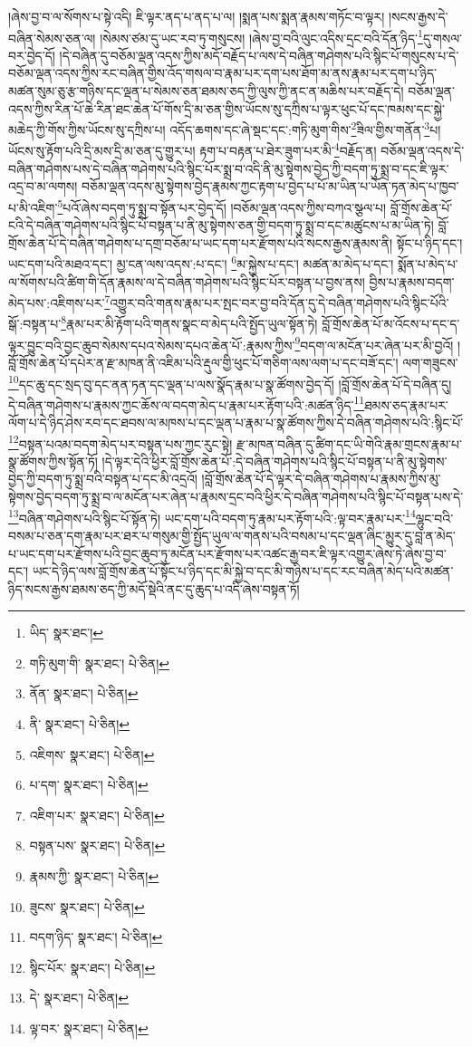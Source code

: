 །ཞེས་བྱ་བ་ལ་སོགས་པ་སྟེ་འདི། ཇི་ལྟར་ནད་པ་ནད་པ་ལ། །སྨན་པས་སྨན་རྣམས་གཏོང་བ་ལྟར། །སངས་རྒྱས་དེ་བཞིན་སེམས་ཅན་ལ། །སེམས་ཙམ་དུ་ཡང་རབ་ཏུ་གསུངས། །ཞེས་བྱ་བའི་ལུང་འདིས་དྲང་བའི་དོན་ཉིད་\footnote{ཡིད་  སྣར་ཐང་། }དུ་གསལ་བར་བྱེད་དོ། །དེ་བཞིན་དུ་བཅོམ་ལྡན་འདས་ཀྱིས་མདོ་བརྗོད་པ་ལས་དེ་བཞིན་གཤེགས་པའི་སྙིང་པོ་གསུངས་པ་དེ་བཅོམ་ལྡན་འདས་ཀྱིས་རང་བཞིན་གྱིས་འོད་གསལ་བ་རྣམ་པར་དག་པས་ཐོག་མ་ནས་རྣམ་པར་དག་པ་ཉིད་མཚན་སུམ་ཅུ་རྩ་གཉིས་དང་ལྡན་པ་སེམས་ཅན་ཐམས་ཅད་ཀྱི་ལུས་ཀྱི་ནང་ན་མཆིས་པར་བརྗོད་དེ། བཅོམ་ལྡན་འདས་ཀྱིས་རིན་པོ་ཆེ་རིན་ཐང་ཆེན་པོ་གོས་དྲི་མ་ཅན་གྱིས་ཡོངས་སུ་དཀྲིས་པ་ལྟར་ཕུང་པོ་དང་ཁམས་དང་སྐྱེ་མཆེད་ཀྱི་གོས་ཀྱིས་ཡོངས་སུ་དཀྲིས་པ། འདོད་ཆགས་དང་ཞེ་སྡང་དང་:གཏི་མུག་གིས་\footnote{གཏི་མུག་གི་  སྣར་ཐང་།  པེ་ཅིན། }ཟིལ་གྱིས་གནོན་\footnote{ནོན་  སྣར་ཐང་།  པེ་ཅིན། }པ། ཡོངས་སུ་རྟོག་པའི་དྲི་མས་དྲི་མ་ཅན་དུ་གྱུར་པ། རྟག་པ་བརྟན་པ་ཐེར་ཟུག་པར་མི་\footnote{ནི་  སྣར་ཐང་།  པེ་ཅིན། }བརྗོད་ན། བཅོམ་ལྡན་འདས་དེ་བཞིན་གཤེགས་པས་དེ་བཞིན་གཤེགས་པའི་སྙིང་པོར་སྨྲ་བ་འདི་ནི་མུ་སྟེགས་བྱེད་ཀྱི་བདག་ཏུ་སྨྲ་བ་དང་ཇི་ལྟར་འདྲ་བ་མ་ལགས། བཅོམ་ལྡན་འདས་མུ་སྟེགས་བྱེད་རྣམས་ཀྱང་རྟག་པ་བྱེད་པ་པོ་མ་ཡིན་པ་ཡོན་ཏན་མེད་པ་ཁྱབ་པ་མི་འཇིག་\footnote{འཇིགས་  སྣར་ཐང་།  པེ་ཅིན། }པའོ་ཞེས་བདག་ཏུ་སྨྲ་བ་སྟོན་པར་བྱེད་དོ། །བཅོམ་ལྡན་འདས་ཀྱིས་བཀའ་སྩལ་པ། བློ་གྲོས་ཆེན་པོ་ངའི་དེ་བཞིན་གཤེགས་པའི་སྙིང་པོ་བསྟན་པ་ནི་མུ་སྟེགས་ཅན་གྱི་བདག་ཏུ་སྨྲ་བ་དང་མཚུངས་པ་མ་ཡིན་ཏེ། བློ་གྲོས་ཆེན་པོ་དེ་བཞིན་གཤེགས་པ་དགྲ་བཅོམ་པ་ཡང་དག་པར་རྫོགས་པའི་སངས་རྒྱས་རྣམས་ནི། སྟོང་པ་ཉིད་དང་། ཡང་དག་པའི་མཐའ་དང་། མྱ་ངན་ལས་འདས་:པ་དང་། \footnote{པ་དག་  སྣར་ཐང་།  པེ་ཅིན། }མ་སྐྱེས་པ་དང་། མཚན་མ་མེད་པ་དང་། སྨོན་པ་མེད་པ་ལ་སོགས་པའི་ཚིག་གི་དོན་རྣམས་ལ་དེ་བཞིན་གཤེགས་པའི་སྙིང་པོར་བསྟན་པ་བྱས་ནས། བྱིས་པ་རྣམས་བདག་མེད་པས་:འཇིགས་པར་\footnote{འཇིག་པར་  སྣར་ཐང་།  པེ་ཅིན། }འགྱུར་བའི་གནས་རྣམ་པར་སྤང་བར་བྱ་བའི་དོན་དུ་དེ་བཞིན་གཤེགས་པའི་སྙིང་པོའི་སྒོ་:བསྟན་པ་\footnote{བསྟན་པས་  སྣར་ཐང་།  པེ་ཅིན། }རྣམ་པར་མི་རྟོག་པའི་གནས་སྣང་བ་མེད་པའི་སྤྱོད་ཡུལ་སྟོན་ཏེ། བློ་གྲོས་ཆེན་པོ་མ་འོངས་པ་དང་ད་ལྟར་བྱུང་བའི་བྱང་ཆུབ་སེམས་དཔའ་སེམས་དཔའ་ཆེན་པོ་:རྣམས་ཀྱིས་\footnote{རྣམས་ཀྱི་  སྣར་ཐང་།  པེ་ཅིན། }བདག་ལ་མངོན་པར་ཞེན་པར་མི་བྱའོ། །བློ་གྲོས་ཆེན་པོ་དཔེར་ན་རྫ་མཁན་ནི་འཇིམ་པའི་རྡུལ་གྱི་ཕུང་པོ་གཅིག་ལས་ལག་པ་དང་བཟོ་དང་། ལག་གཟུངས་\footnote{ཟུངས་  སྣར་ཐང་།  པེ་ཅིན། }དང་ཆུ་དང་སྲད་བུ་དང་ནན་ཏན་དང་ལྡན་པ་ལས་སྣོད་རྣམ་པ་སྣ་ཚོགས་བྱེད་དོ། །བློ་གྲོས་ཆེན་པོ་དེ་བཞིན་དུ། དེ་བཞིན་གཤེགས་པ་རྣམས་ཀྱང་ཆོས་ལ་བདག་མེད་པ་རྣམ་པར་རྟོག་པའི་:མཚན་ཉིད་\footnote{བདག་ཉིད་  སྣར་ཐང་།  པེ་ཅིན། }ཐམས་ཅད་རྣམ་པར་ལོག་པ་དེ་ཉིད་ཤེས་རབ་དང་ཐབས་ལ་མཁས་པ་དང་ལྡན་པ་རྣམ་པ་སྣ་ཚོགས་ཀྱིས་དེ་བཞིན་གཤེགས་པའི་:སྙིང་པོ་\footnote{སྙིང་པོར་  སྣར་ཐང་།  པེ་ཅིན། }བསྟན་པའམ་བདག་མེད་པར་བསྟན་པས་ཀྱང་རུང་སྟེ། རྫ་མཁན་བཞིན་དུ་ཚིག་དང་ཡི་གེའི་རྣམ་གྲངས་རྣམ་པ་སྣ་ཚོགས་ཀྱིས་སྟོན་ཏོ། །དེ་ལྟར་དེའི་ཕྱིར་བློ་གྲོས་ཆེན་པོ་:དེ་བཞིན་གཤེགས་པའི་སྙིང་པོ་བསྟན་པ་ནི་མུ་སྟེགས་བྱེད་ཀྱི་བདག་ཏུ་སྨྲ་བའི་བསྟན་པ་དང་མི་འདྲའོ། །བློ་གྲོས་ཆེན་པོ་དེ་ལྟར་དེ་བཞིན་གཤེགས་པ་རྣམས་ཀྱིས་མུ་སྟེགས་བྱེད་བདག་ཏུ་སྨྲ་བ་ལ་མངོན་པར་ཞེན་པ་རྣམས་དྲང་བའི་ཕྱིར་དེ་བཞིན་གཤེགས་པའི་སྙིང་པོ་བསྟན་པས་དེ་\footnote{དེ་  སྣར་ཐང་།  པེ་ཅིན། }བཞིན་གཤེགས་པའི་སྙིང་པོ་སྟོན་ཏེ། ཡང་དག་པའི་བདག་ཏུ་རྣམ་པར་རྟོག་པའི་:ལྟ་བར་རྣམ་པར་\footnote{ལྟ་བར་  སྣར་ཐང་།  པེ་ཅིན། }ལྷུང་བའི་བསམ་པ་ཅན་དག་རྣམ་པར་ཐར་པ་གསུམ་གྱི་སྤྱོད་ཡུལ་ལ་གནས་པའི་བསམ་པ་དང་ལྡན་ཞིང་མྱུར་དུ་བླ་ན་མེད་པ་ཡང་དག་པར་རྫོགས་པའི་བྱང་ཆུབ་ཏུ་མངོན་པར་རྫོགས་པར་འཚང་རྒྱ་བར་ཇི་ལྟར་འགྱུར་ཞེས་ཏེ་ཞེས་བྱ་བ་དང་། ཡང་དེ་ཉིད་ལས་བློ་གྲོས་ཆེན་པོ་སྟོང་པ་ཉིད་དང་མི་སྐྱེ་བ་དང་མི་གཉིས་པ་དང་རང་བཞིན་མེད་པའི་མཚན་ཉིད་སངས་རྒྱས་ཐམས་ཅད་ཀྱི་མདོ་སྡེའི་ནང་དུ་ཆུད་པ་འདི་ཞེས་བསྟན་ཏོ། 